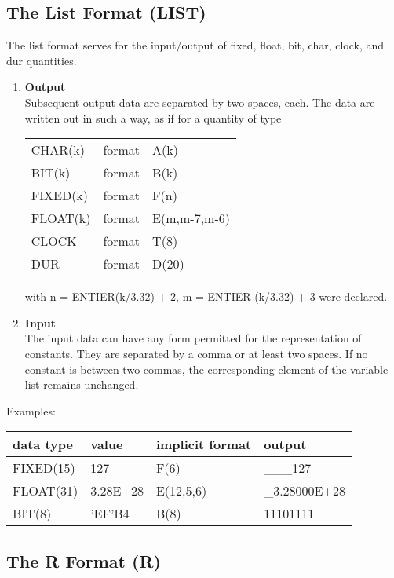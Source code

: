 \subsection{The List Format (LIST)}    %
\label{sec_dation_list_format}



The list format serves for the input/output of fixed, float, bit, char,
clock, and dur quantities.
\begin{enumerate}
\item {\bf Output}\\
Subsequent output data are separated by two spaces, each. The data are
written out in such a way, as if for a quantity of type

\begin{tabular}{lll}
CHAR(k)  & format & A(k)\\
BIT(k)   & format & B(k)\\
FIXED(k) & format & F(n)\\
FLOAT(k) & format & E(m,m-7,m-6)\\
CLOCK    & format & T(8)\\
DUR      & format & D(20)
\end{tabular}

with n = ENTIER(k/3.32) + 2, m = ENTIER (k/3.32) + 3 were
declared.
\item {\bf Input}\\
The input data can have any form permitted for the representation of
constants. They are separated by a comma or at least two spaces. If no
constant is between two commas, the corresponding element of the
variable list remains unchanged.
\end{enumerate}

Examples:

\begin{tabular}{llll}
data type & value    & implicit format & output \\ \hline
FIXED(15) & 127      & F(6)            & \_\_\_127 \\
FLOAT(31) & 3.28E+28 & E(12,5,6)       & \_3.28000E+28\\
BIT(8)    & 'EF'B4   & B(8)            & 11101111
\end{tabular}

\subsection{The R Format (R)}   %
\label{sec_dation_r_format}

